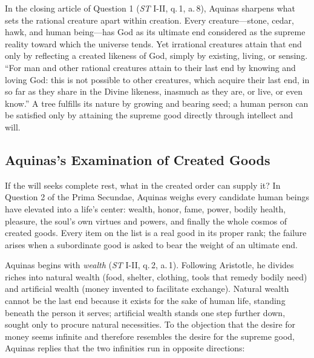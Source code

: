 In the closing article of Question 1 (\emph{ST} I-II, q.\,1, a.\,8), Aquinas sharpens what sets the rational creature apart within creation. Every creature---stone, cedar, hawk, and human being---has God as its ultimate end considered as the supreme reality toward which the universe tends. Yet irrational creatures attain that end only by reflecting a created likeness of God, simply by existing, living, or sensing. ``For man and other rational creatures attain to their last end by knowing and loving God: this is not possible to other creatures, which acquire their last end, in so far as they share in the Divine likeness, inasmuch as they are, or live, or even know.'' A tree fulfills its nature by growing and bearing seed; a human person can be satisfied only by attaining the supreme good directly through intellect and will.

\subsection*{Aquinas's Examination of Created Goods}

If the will seeks complete rest, what in the created order can supply it? In Question 2 of the Prima Secundae, Aquinas weighs every candidate human beings have elevated into a life's center: wealth, honor, fame, power, bodily health, pleasure, the soul's own virtues and powers, and finally the whole cosmos of created goods. Every item on the list is a real good in its proper rank; the failure arises when a subordinate good is asked to bear the weight of an ultimate end.

Aquinas begins with \emph{wealth} (\emph{ST} I-II, q.\,2, a.\,1). Following Aristotle, he divides riches into natural wealth (food, shelter, clothing, tools that remedy bodily need) and artificial wealth (money invented to facilitate exchange). Natural wealth cannot be the last end because it exists for the sake of human life, standing beneath the person it serves; artificial wealth stands one step further down, sought only to procure natural necessities. To the objection that the desire for money seems infinite and therefore resembles the desire for the supreme good, Aquinas replies that the two infinities run in opposite directions:

